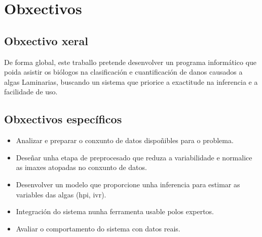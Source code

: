 \section{Obxectivos}

\subsection{Obxectivo xeral}
De forma global, este traballo pretende desenvolver un programa informático que poida asistir os biólogos 
na clasificación e cuantificación de danos causados a algas Laminarias, buscando un sistema que priorice 
a exactitude na inferencia e a facilidade de uso.

\subsection{Obxectivos específicos}

\begin{itemize}
    \item Analizar e preparar o conxunto de datos dispoñibles para o problema.
    \item Deseñar unha etapa de preprocesado que reduza a variabilidade e normalice as imaxes atopadas no conxunto de datos.
    \item Desenvolver un modelo que proporcione unha inferencia para estimar as variables das algas (\gls{hpi}, \gls{ivr}).
    \item Integración do sistema nunha ferramenta usable polos expertos.
    \item Avaliar o comportamento do sistema con datos reais.
\end{itemize}
